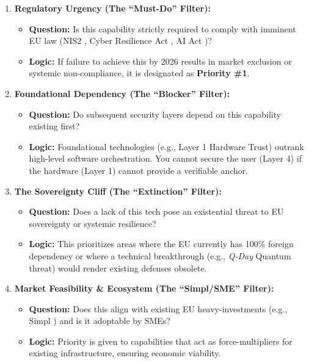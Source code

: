 \documentclass[12pt,a4paper]{report}
\begin{document}
\begin{enumerate}
    \item \textbf{Regulatory Urgency (The ``Must-Do''  Filter):}
    \begin{itemize}
        \item \textbf{Question:} Is this capability strictly required to comply with imminent EU law (NIS2 \cite{nis2}, Cyber Resilience Act \cite{cra}, AI Act \cite{aiact})?
        \item \textbf{Logic:} If failure to achieve this by 2026 results in market exclusion or systemic non-compliance, it is designated as \textbf{Priority \#1}.
    \end{itemize}

    \item \textbf{Foundational Dependency (The ``Blocker''  Filter):}
    \begin{itemize}
        \item \textbf{Question:} Do subsequent security layers depend on this capability existing first?
        \item \textbf{Logic:} Foundational technologies (e.g., Layer 1 Hardware Trust) outrank high-level software orchestration. You cannot secure the user (Layer 4) if the hardware (Layer 1) cannot provide a verifiable anchor.
    \end{itemize}

    \item \textbf{The Sovereignty Cliff (The ``Extinction''  Filter):}
    \begin{itemize}
        \item \textbf{Question:} Does a lack of this tech pose an existential threat to EU sovereignty or systemic resilience?
        \item \textbf{Logic:} This prioritizes areas where the EU currently has 100\% foreign dependency or where a technical breakthrough (e.g., \textit{Q-Day} Quantum threat) would render existing defenses obsolete.
    \end{itemize}

    \item \textbf{Market Feasibility \& Ecosystem (The ``Simpl/SME''  Filter):}
    \begin{itemize}
        \item \textbf{Question:} Does this align with existing EU heavy-investments (e.g., Simpl \cite{cloud_edge_roadmap}) and is it adoptable by SMEs?
        \item \textbf{Logic:} Priority is given to capabilities that act as force-multipliers for existing infrastructure, ensuring economic viability.
    \end{itemize}
\end{enumerate}
\end{document}
